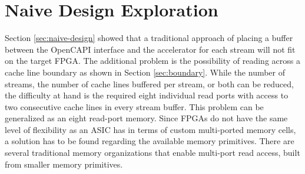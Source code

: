 




\section{Naive Design Exploration}
Section \ref{sec:naive-design} showed that a traditional approach of placing a buffer between the OpenCAPI interface and the accelerator for each stream will not fit on the target FPGA. The additional problem is the possibility of reading across a cache line boundary as shown in Section \ref{sec:boundary}. While the number of streams, the number of cache lines buffered per stream, or both can be reduced, the difficulty at hand is the required eight individual read ports with access to two consecutive cache lines in every stream buffer. This problem can be generalized as an eight read-port memory. Since FPGAs do not have the same level of flexibility as an ASIC has in terms of custom multi-ported memory cells, a solution has to be found regarding the available memory primitives. There are several traditional memory organizations that enable multi-port read access, built from smaller memory primitives.

